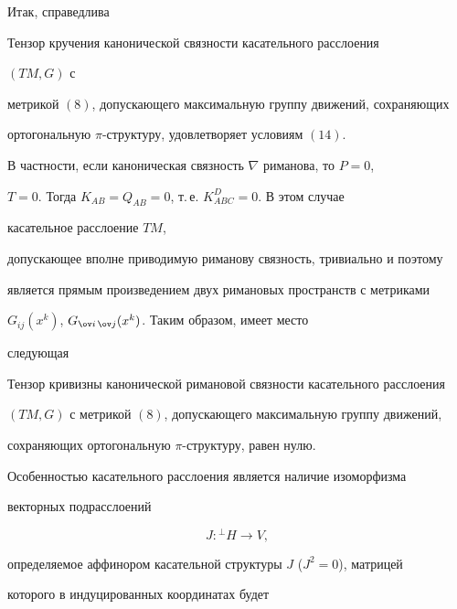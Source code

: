 Итак, справедлива





\begin{thm}


Тензор кручения канонической связности касательного расслоения


$(TM,G)$ с


метрикой $(8)$, допускающего максимальную группу движений, сохраняющих


ортогональную $\pi$-структуру, удовлетворяет условиям $(14)$.


\end{thm}





В частности, если каноническая связность $\nabla$ риманова, то $P=0$,


$T=0$. Тогда $K_{AB}=Q_{AB}=0$, т.\,е. $K^D_{ABC}=0$. В этом случае


\cite{3} касательное расслоение $TM$,


допускающее вполне приводимую риманову связность, тривиально и поэтому


является прямым произведением двух римановых пространств с метриками


$G_{ij}(x^k)$, $G_{\ov i\,\ov j}(x^k)$. Таким образом, имеет место


следующая





\begin{thm}


Тензор кривизны канонической римановой связности касательного расслоения


$(TM,G)$ с метрикой $(8)$, допускающего максимальную группу движений,


сохраняющих ортогональную $\pi$-структуру, равен нулю.


\end{thm}





Особенностью касательного расслоения является наличие изоморфизма


векторных подрасслоений


$$


J:{}^\bot H\to V,


$$


определяемое аффинором касательной структуры $J$ ($J^2=0$), матрицей


которого в индуцированных координатах будет



